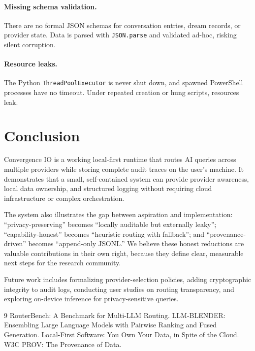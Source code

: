 \documentclass{article}
\begin{document}
\paragraph{Missing schema validation.} There are no formal JSON schemas for
conversation entries, dream records, or provider state. Data is parsed with
\texttt{JSON.parse} and validated ad-hoc, risking silent corruption.

\paragraph{Resource leaks.} The Python \texttt{ThreadPoolExecutor} is never
shut down, and spawned PowerShell processes have no timeout. Under repeated
creation or hung scripts, resources leak.

\section{Conclusion}

Convergence IO is a working local-first runtime that routes AI queries across
multiple providers while storing complete audit traces on the user's machine. It
demonstrates that a small, self-contained system can provide provider
awareness, local data ownership, and structured logging without requiring cloud
infrastructure or complex orchestration.

The system also illustrates the gap between aspiration and implementation:
``privacy-preserving'' becomes ``locally auditable but externally leaky'';
``capability-honest'' becomes ``heuristic routing with fallback''; and
``provenance-driven'' becomes ``append-only JSONL.'' We believe these honest
reductions are valuable contributions in their own right, because they define
clear, measurable next steps for the research community.

Future work includes formalizing provider-selection policies, adding
cryptographic integrity to audit logs, conducting user studies on routing
transparency, and exploring on-device inference for privacy-sensitive queries.


\begin{thebibliography}{9}
 RouterBench: A Benchmark for Multi-LLM Routing.
 LLM-BLENDER: Ensembling Large Language Models with Pairwise Ranking and Fused Generation.
 Local-First Software: You Own Your Data, in Spite of the Cloud.
 W3C PROV: The Provenance of Data.
\end{thebibliography}
\end{document}
